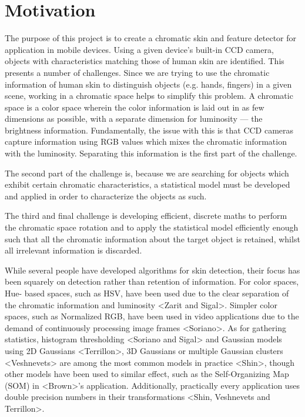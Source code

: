 
\chapter{Motivation}  %

\ifpdf
    \graphicspath{{Chapter1/Figs/Raster/}{Chapter2/Figs/PDF/}{Chapter2/Figs/}}
\else
    \graphicspath{{Chapter1/Figs/Vector/}{Chapter2/Figs/}}
\fi

The purpose of this project is to create a chromatic skin and feature detector for application in mobile devices. Using a given device's built-in CCD camera, objects with characteristics matching those of human skin are identified. This presents a number of challenges. Since we are trying to use the chromatic information of human skin to distinguish objects (e.g. hands, fingers) in a given scene, working in a chromatic space helps to simplify this problem. A chromatic space is a color space wherein the color information is laid out in as few dimensions as possible, with a separate dimension for luminosity --- the brightness information. Fundamentally, the issue with this is that CCD cameras capture information using RGB values which mixes the chromatic information with the luminosity. Separating this information is the first part of the challenge.

The second part of the challenge is, because we are searching for objects which exhibit certain chromatic characteristics, a statistical model must be developed and applied in order to characterize the objects as such.

The third and final challenge is developing efficient, discrete maths to perform the chromatic space rotation and to apply the statistical model efficiently enough such that all the chromatic information about the target object is retained, whilst all irrelevant information is discarded.

While several people have developed algorithms for skin detection, their focus has been squarely on detection rather than retention of information. For color spaces, Hue- based spaces, such as HSV, have been used due to the clear separation of the chromatic information and luminosity <Zarit and Sigal>. Simpler color spaces, such as Normalized RGB, have been used in video applications due to the demand of continuously processing image frames <Soriano>. As for gathering statistics, histogram thresholding <Soriano and Sigal> and Gaussian models using 2D Gaussians <Terrillon>, 3D Gaussians or multiple Gaussian clusters <Veshnevets> are among the most common models in practice <Shin>, though other models have been used to similar effect, such as the Self-Organizing Map (SOM) in <Brown>'s application. Additionally, practically every application uses double precision numbers in their transformations <Shin, Veshnevets and Terrillon>.

